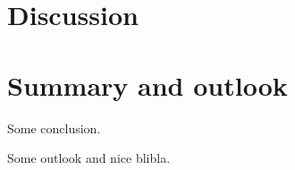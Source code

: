 

\chapter{Discussion}


\chapter{Summary and outlook}
\label{chap:summary}
Some conclusion.

Some outlook and nice blibla.